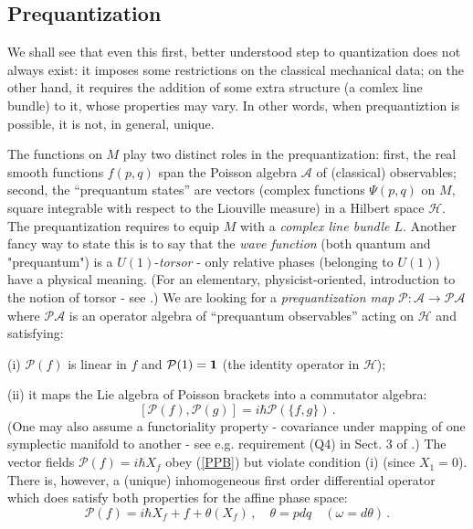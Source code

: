 \documentclass[12pt]{article}
\begin{document}
\smallskip

\subsection{Prequantization}

We shall see that even this first, better understood step to quantization does
not always exist: it imposes some restrictions on the classical mechanical data; on
the other hand, it requires the addition of some extra structure (a comlex line
bundle) to it, whose properties may vary. In other words, when prequantiztion is
possible, it is not, in general, unique.

The functions on $M$ play two distinct roles in the prequantization: first, the real
smooth functions $f(p, q)$ span the Poisson algebra $\mathcal{A}$ of (classical) observables;
second, the ``prequantum states'' are vectors (complex functions $\Psi(p, q)$ on $M$,
square integrable with respect to the Liouville measure) in a Hilbert space $\mathcal{H}$.
The prequantization requires to equip $M$ with a {\it complex line bundle $L$}. Another fancy
way to state this is to say that the {\it wave function} (both quantum and "prequantum") is
a $U(1)$-{\it torsor} - only relative phases (belonging to $U(1)$) have a physical meaning.
(For an elementary, physicist-oriented, introduction to the notion of torsor - see
\cite{B09}.)  We are looking for a {\it prequantization map} $\mathcal{P}: \mathcal{A} \rightarrow
\mathcal{P}\mathcal{A}$ where $\mathcal{P}\mathcal{A}$ is an operator algebra of ``prequantum observables''
acting on $\mathcal{H}$ and satisfying:

(i) ${\mathcal P}(f)$ is linear in $f$ and ${\mathcal P}(1) = {\bf 1}$
(the identity operator in ${\mathcal H}$);

(ii) it maps the Lie algebra of Poisson brackets into a commutator algebra:
\begin{equation}
\label{PPB}
 [{\mathcal P}(f),{\mathcal P}(g)] = i \hbar {\mathcal P}(\{f, g\})\,.
\end{equation}
(One may also assume a functoriality property - covariance under mapping of one symplectic manifold
to another - see e.g. requirement (Q4) in Sect. 3 of \cite{AE}.) The vector fields ${\mathcal P}(f)= i \hbar
X_f$ obey (\ref{PPB}) but violate condition (i) (since $X_1 = 0$). There is, however, a (unique) inhomogeneous
first order differential operator which does satisfy both properties for the affine phase space:
\begin{equation}
 \label{P(f)}
{\mathcal P}(f) = i \hbar X_f + f + \theta(X_f)\,, \quad \theta = p dq \quad (\omega = d\theta)\,.
\end{equation}
\end{document}
